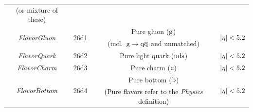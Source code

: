 \documentclass[11pt,twoside,a4paper,cmspaper,final,collab]{cms-tdr}
\begin{document}
\begin{table}
{\begin{tabular}{c|c|c|c}
(or mixture of these) &&&\\
\multirow{2}{*}{\textit{FlavorGluon} } & \multirow{2}{*}{26d1}  & Pure gluon ($\mathrm{g}$) & \multirow{2}{*}{$\lvert \eta \rvert<5.2$}  \\
&& (incl.~$ \mathrm{g} \to \mathrm{q} \overline{\mathrm{q}} $ and unmatched) & \\
\textit{FlavorQuark} & 26d2 & Pure light quark ($\mathrm{u}\mathrm{d}\mathrm{s}$) &  $\lvert \eta \rvert<5.2$ \\
\textit{FlavorCharm} & 26d3 & Pure charm ($\mathrm{c}$) & $\lvert \eta \rvert<5.2$ \\
\multirow{2}{*}{\textit{FlavorBottom}}  &\multirow{2}{*}{ 26d4}  & Pure bottom ($\mathrm{b}$) &  \multirow{2}{*}{$\lvert \eta \rvert<5.2$ } \\
&& (Pure flavors refer to the \textit{Physics} definition) & \\ [0.5ex]
\hline
\end{tabular}
}
\end{table}
\end{document}
